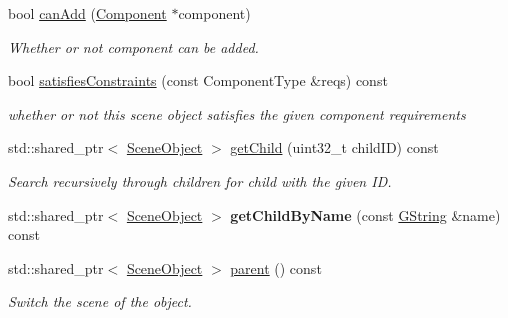 \begin{Indent}
\begin{DoxyCompactItemize}
bool \mbox{\hyperlink{classrev_1_1_scene_object_a9216d4fa30e4c96b7c14b6d0ab890783}{can\+Add}} (\mbox{\hyperlink{classrev_1_1_component}{Component}} $\ast$component)
\begin{DoxyCompactList}\small\item\em Whether or not component can be added. \end{DoxyCompactList}\item 
\mbox{\label{classrev_1_1_scene_object_a26c7e5c41224ebb0e6d42684e4c2ea68}} 
bool \mbox{\hyperlink{classrev_1_1_scene_object_a26c7e5c41224ebb0e6d42684e4c2ea68}{satisfies\+Constraints}} (const Component\+Type \&reqs) const
\begin{DoxyCompactList}\small\item\em whether or not this scene object satisfies the given component requirements \end{DoxyCompactList}\item 
\mbox{\label{classrev_1_1_scene_object_a1b3529e045828a384cbbe1675050fe77}} 
std\+::shared\+\_\+ptr$<$ \mbox{\hyperlink{classrev_1_1_scene_object}{Scene\+Object}} $>$ \mbox{\hyperlink{classrev_1_1_scene_object_a1b3529e045828a384cbbe1675050fe77}{get\+Child}} (uint32\+\_\+t child\+ID) const
\begin{DoxyCompactList}\small\item\em Search recursively through children for child with the given ID. \end{DoxyCompactList}\item 
\mbox{\label{classrev_1_1_scene_object_a90c9ac72d534a031d29bd7191e54b101}} 
std\+::shared\+\_\+ptr$<$ \mbox{\hyperlink{classrev_1_1_scene_object}{Scene\+Object}} $>$ {\bfseries get\+Child\+By\+Name} (const \mbox{\hyperlink{classrev_1_1_g_string}{G\+String}} \&name) const
\item 
std\+::shared\+\_\+ptr$<$ \mbox{\hyperlink{classrev_1_1_scene_object}{Scene\+Object}} $>$ \mbox{\hyperlink{classrev_1_1_scene_object_a51980b8993675edf967883dd6988dce8}{parent}} () const
\begin{DoxyCompactList}\small\item\em Switch the scene of the object. \end{DoxyCompactList}\item 
\mbox{\label{classrev_1_1_scene_object_a3f3f344da38a824041b4c911da8686fd}} 

\end{DoxyCompactItemize}
\end{Indent}
